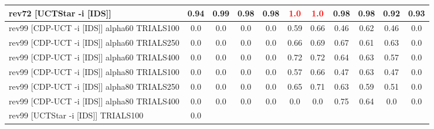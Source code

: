\documentclass{article}
\begin{document}
\begin{tabular}{|l|r@{$\pm$}rr@{$\pm$}rr@{$\pm$}rr@{$\pm$}rr@{$\pm$}rr@{$\pm$}rr@{$\pm$}rr@{$\pm$}rr@{$\pm$}rr@{$\pm$}r|}
\\
rev72 [UCTStar -i [IDS]]
& \multicolumn{2}{c}{0.94}
& \multicolumn{2}{c}{0.99}
& \multicolumn{2}{c}{0.98}
& \multicolumn{2}{c}{0.98}
& \multicolumn{2}{c}{\textbf{\textcolor{red}{1.0}}}
& \multicolumn{2}{c}{\textbf{\textcolor{red}{1.0}}}
& \multicolumn{2}{c}{0.98}
& \multicolumn{2}{c}{0.98}
& \multicolumn{2}{c}{0.92}
& \multicolumn{2}{c|}{0.93}
\\
\hline
rev99 [CDP-UCT -i [IDS]] alpha60 TRIALS100
& \multicolumn{2}{c}{0.0}
& \multicolumn{2}{c}{0.0}
& \multicolumn{2}{c}{0.0}
& \multicolumn{2}{c}{0.0}
& \multicolumn{2}{c}{0.59}
& \multicolumn{2}{c}{0.66}
& \multicolumn{2}{c}{0.46}
& \multicolumn{2}{c}{0.62}
& \multicolumn{2}{c}{0.46}
& \multicolumn{2}{c|}{0.0}
\\
rev99 [CDP-UCT -i [IDS]] alpha60 TRIALS250
& \multicolumn{2}{c}{0.0}
& \multicolumn{2}{c}{0.0}
& \multicolumn{2}{c}{0.0}
& \multicolumn{2}{c}{0.0}
& \multicolumn{2}{c}{0.66}
& \multicolumn{2}{c}{0.69}
& \multicolumn{2}{c}{0.67}
& \multicolumn{2}{c}{0.61}
& \multicolumn{2}{c}{0.63}
& \multicolumn{2}{c|}{0.0}
\\
rev99 [CDP-UCT -i [IDS]] alpha60 TRIALS400
& \multicolumn{2}{c}{0.0}
& \multicolumn{2}{c}{0.0}
& \multicolumn{2}{c}{0.0}
& \multicolumn{2}{c}{0.0}
& \multicolumn{2}{c}{0.72}
& \multicolumn{2}{c}{0.72}
& \multicolumn{2}{c}{0.64}
& \multicolumn{2}{c}{0.63}
& \multicolumn{2}{c}{0.57}
& \multicolumn{2}{c|}{0.0}
\\
rev99 [CDP-UCT -i [IDS]] alpha80 TRIALS100
& \multicolumn{2}{c}{0.0}
& \multicolumn{2}{c}{0.0}
& \multicolumn{2}{c}{0.0}
& \multicolumn{2}{c}{0.0}
& \multicolumn{2}{c}{0.57}
& \multicolumn{2}{c}{0.66}
& \multicolumn{2}{c}{0.47}
& \multicolumn{2}{c}{0.63}
& \multicolumn{2}{c}{0.47}
& \multicolumn{2}{c|}{0.0}
\\
rev99 [CDP-UCT -i [IDS]] alpha80 TRIALS250
& \multicolumn{2}{c}{0.0}
& \multicolumn{2}{c}{0.0}
& \multicolumn{2}{c}{0.0}
& \multicolumn{2}{c}{0.0}
& \multicolumn{2}{c}{0.65}
& \multicolumn{2}{c}{0.71}
& \multicolumn{2}{c}{0.63}
& \multicolumn{2}{c}{0.59}
& \multicolumn{2}{c}{0.51}
& \multicolumn{2}{c|}{0.0}
\\
rev99 [CDP-UCT -i [IDS]] alpha80 TRIALS400
& \multicolumn{2}{c}{0.0}
& \multicolumn{2}{c}{0.0}
& \multicolumn{2}{c}{0.0}
& \multicolumn{2}{c}{0.0}
& \multicolumn{2}{c}{0.0}
& \multicolumn{2}{c}{0.0}
& \multicolumn{2}{c}{0.75}
& \multicolumn{2}{c}{0.64}
& \multicolumn{2}{c}{0.0}
& \multicolumn{2}{c|}{0.0}
\\
rev99 [UCTStar -i [IDS]] TRIALS100
& \multicolumn{2}{c}{0.0}

\end{tabular}
\end{document}
